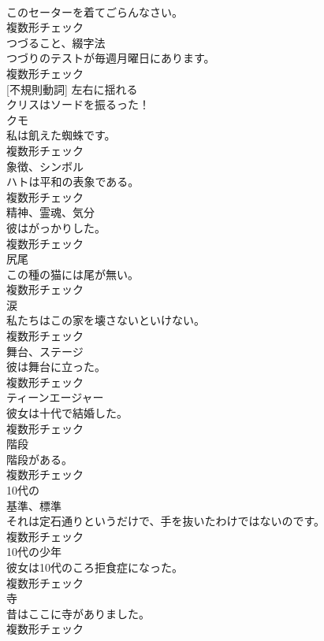 \documentclass[8pt]{extreport}
\begin{document}
\begin{CJK}{UTF8}{min}
\\	このセーターを着てごらんなさい。	
\\	複数形チェック
\\	[名詞]	つづること、綴字法	
\\	つづりのテストが毎週月曜日にあります。	
\\	複数形チェック
\\	[動詞] [不規則動詞]	左右に揺れる	
\\	クリスはソードを振るった！	
\\	[名詞]	クモ	
\\	私は飢えた蜘蛛です。	
\\	複数形チェック
\\	[名詞]	象徴、シンボル	
\\	ハトは平和の表象である。	
\\	複数形チェック
\\	[名詞]	精神、霊魂、気分	
\\	彼はがっかりした。	
\\	複数形チェック
\\	[名詞]	尻尾	
\\	この種の猫には尾が無い。	
\\	複数形チェック
\\	[名詞]	涙	
\\	私たちはこの家を壊さないといけない。	
\\	複数形チェック
\\	[名詞]	舞台、ステージ	
\\	彼は舞台に立った。	
\\	複数形チェック
\\	[名詞]	ティーンエージャー	
\\	彼女は十代で結婚した。	
\\	複数形チェック
\\	[名詞]	階段	
\\	階段がある。	
\\	複数形チェック
\\	[形容詞]	10代の	
\\	[名詞]	基準、標準	
\\	それは定石通りというだけで、手を抜いたわけではないのです。	
\\	複数形チェック
\\	[名詞]	10代の少年	
\\	彼女は10代のころ拒食症になった。	
\\	複数形チェック
\\	[名詞]	寺	
\\	昔はここに寺がありました。	
\\	複数形チェック

\end{CJK}
\end{document}
